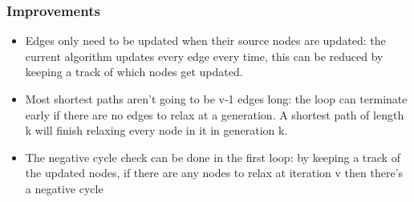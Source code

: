 \subsubsection{Improvements}
\begin{itemize}
    \item Edges only need to be updated when their source nodes are updated: the current algorithm updates every edge every time, this can be reduced by keeping a track of which nodes get updated. 
    \item Most shortest paths aren't going to be v-1 edges long: the loop can terminate early if there are no edges to relax at a generation. A shortest path of length k will finish relaxing every node in it in generation k.
    \item The negative cycle check can be done in the first loop: by keeping a track of the updated nodes, if there are any nodes to relax at iteration v then there's a negative cycle
\end{itemize}


